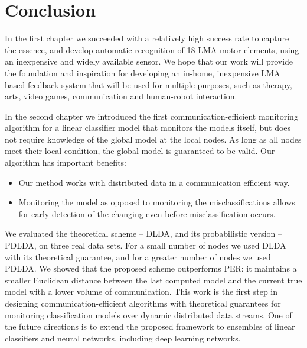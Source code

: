 
\chapter{Conclusion}
\label{chap:conclusion}
In the first chapter we succeeded with a relatively high success rate to
capture the essence, and develop automatic recognition of 18 LMA motor elements,
using an inexpensive and widely available sensor. We hope that our work will
provide the foundation and inspiration for developing an in-home, inexpensive
LMA based feedback system that will be used for multiple purposes, such as
therapy, arts, video games, communication and human-robot interaction.

In the second chapter we introduced the first communication-efficient monitoring algorithm for a linear classifier model that monitors the
models itself, but does not require knowledge of the global model at the local nodes.
As long as all nodes meet their local condition, the
global model is guaranteed to be valid. Our algorithm has important benefits:
\begin{itemize}
  \item Our method works with distributed data in a communication efficient way.
  \item Monitoring the model as opposed to monitoring the misclassifications
  allows for early detection of the changing even before misclassification
  occurs.
\end{itemize}

We evaluated the theoretical scheme -- DLDA, and its probabilistic version -- PDLDA, on three real data sets.
For a small number of nodes we used DLDA with its theoretical guarantee, and for a greater number of nodes we used
PDLDA. We showed that the proposed scheme outperforms PER: it maintains a smaller Euclidean distance between
the last computed model and the current true model with a lower volume of communication.
This work is the first step in designing communication-efficient algorithms
with theoretical guarantees for monitoring classification models over dynamic distributed data streams. One of the future directions is to extend the proposed framework to
ensembles of linear classifiers and neural networks, including deep learning networks.

